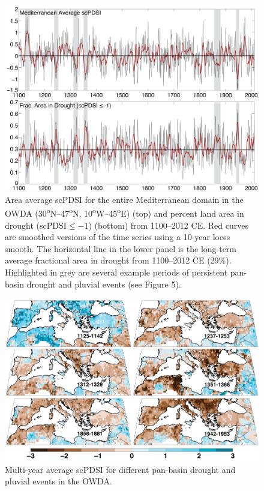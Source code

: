 \documentclass[draft,jgr]{AGUTeX}
\begin{document}
\begin{figure}
\center
\includegraphics[width=1.0\columnwidth]{fig_04_ave_area_pdsi_MED1.png}
\caption{Area average scPDSI for the entire Mediterranean domain in the OWDA (30\textsuperscript{o}N--47\textsuperscript{o}N, 10\textsuperscript{o}W--45\textsuperscript{o}E) (top) and percent land area in drought (scPDSI$\le-1$) (bottom) from 1100--2012 CE. Red curves are smoothed versions of the time series using a 10-year loess smooth. The horizontal line in the lower panel is the long-term average fractional area in drought from 1100--2012 CE (29\%). Highlighted in grey are several example periods of persistent pan-basin drought and pluvial events (see Figure 5).}\label{placeholder}
\end{figure}

\begin{figure}
\center
\includegraphics[width=1.0\columnwidth]{fig_05_drght_pluv_events.png}
\caption{Multi-year average scPDSI for different pan-basin drought and pluvial events in the OWDA.}\label{placeholder}
\end{figure}
\end{document}
